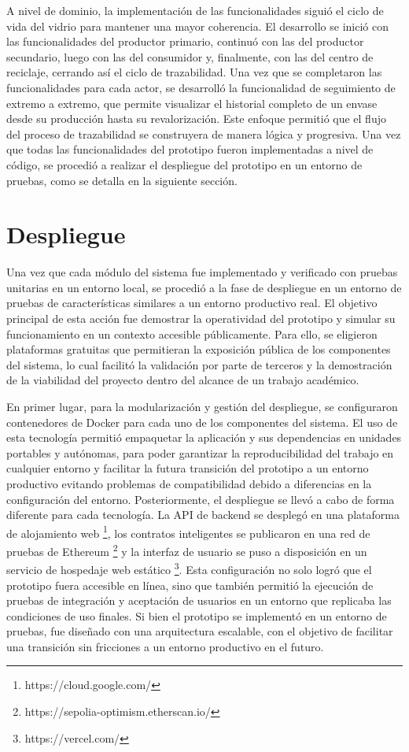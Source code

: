 A nivel de dominio, la implementación de las funcionalidades siguió el ciclo de vida del vidrio para mantener una mayor coherencia. El desarrollo se inició con las funcionalidades del productor primario, continuó con las del productor secundario, luego con las del consumidor y, finalmente, con las del centro de reciclaje, cerrando así el ciclo de trazabilidad. Una vez que se completaron las funcionalidades para cada actor, se desarrolló la funcionalidad de seguimiento de extremo a extremo, que permite visualizar el historial completo de un envase desde su producción hasta su revalorización. Este enfoque permitió que el flujo del proceso de trazabilidad se construyera de manera lógica y progresiva. Una vez que todas las funcionalidades del prototipo fueron implementadas a nivel de código, se procedió a realizar el despliegue del prototipo en un entorno de pruebas, como se detalla en la siguiente sección.

\section{Despliegue}
\label{sec:deployment}

Una vez que cada módulo del sistema fue implementado y verificado con pruebas unitarias en un entorno local, se procedió a la fase de despliegue en un entorno de pruebas de características similares a un entorno productivo real. El objetivo principal de esta acción fue demostrar la operatividad del prototipo y simular su funcionamiento en un contexto accesible públicamente. Para ello, se eligieron plataformas gratuitas que permitieran la exposición pública de los componentes del sistema, lo cual facilitó la validación por parte de terceros y la demostración de la viabilidad del proyecto dentro del alcance de un trabajo académico.

En primer lugar, para la modularización y gestión del despliegue, se configuraron contenedores de Docker para cada uno de los componentes del sistema. El uso de esta tecnología permitió empaquetar la aplicación y sus dependencias en unidades portables y autónomas, para poder garantizar la reproducibilidad del trabajo en cualquier entorno y facilitar la futura transición del prototipo a un entorno productivo evitando problemas de compatibilidad debido a diferencias en la configuración del entorno.
Posteriormente, el despliegue se llevó a cabo de forma diferente para cada tecnología. La API de backend se desplegó en una plataforma de alojamiento web \footnote{https://cloud.google.com/}, los contratos inteligentes se publicaron en una red de pruebas de Ethereum \footnote{https://sepolia-optimism.etherscan.io/} y la interfaz de usuario se puso a disposición en un servicio de hospedaje web estático \footnote{https://vercel.com/}. Esta configuración no solo logró que el prototipo fuera accesible en línea, sino que también permitió la ejecución de pruebas de integración y aceptación de usuarios en un entorno que replicaba las condiciones de uso finales. Si bien el prototipo se implementó en un entorno de pruebas, fue diseñado con una arquitectura escalable, con el objetivo de facilitar una transición sin fricciones a un entorno productivo en el futuro.

